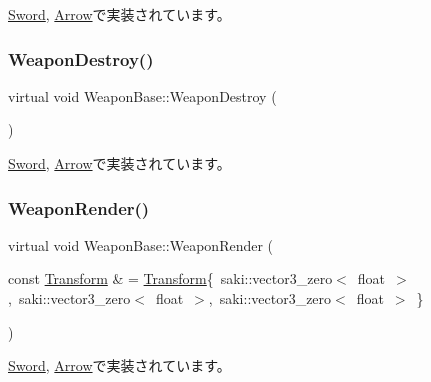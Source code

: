 \mbox{\hyperlink{class_sword_a6c8642e6a8f1d6152abce6c84bf6d21b}{Sword}}, \mbox{\hyperlink{class_arrow_a98ea469bf0b21635b2d2dadb69c72240}{Arrow}}で実装されています。

\mbox{\label{class_weapon_base_a417784a8c8bf73cd398a77b922fc110c}} 
\subsubsection{\texorpdfstring{Weapon\+Destroy()}{WeaponDestroy()}}
{\footnotesize\ttfamily virtual void Weapon\+Base\+::\+Weapon\+Destroy (\begin{DoxyParamCaption}{ }\end{DoxyParamCaption})\hspace{0.3cm}{\ttfamily [pure virtual]}}



\mbox{\hyperlink{class_sword_a3f60d8b24b7847d6a84f0941820b711d}{Sword}}, \mbox{\hyperlink{class_arrow_a1101d1159771b5c428afd3c7a6a0a4df}{Arrow}}で実装されています。

\mbox{\label{class_weapon_base_af308d16d3892c3ffaeedf74b08e761b9}} 
\subsubsection{\texorpdfstring{Weapon\+Render()}{WeaponRender()}}
{\footnotesize\ttfamily virtual void Weapon\+Base\+::\+Weapon\+Render (\begin{DoxyParamCaption}\item[{const \mbox{\hyperlink{common_8h_a1c43cb8f0d8a41901f3ce4c67dbbce20}{Transform}} \&}]{ = {\ttfamily \mbox{\hyperlink{common_8h_a1c43cb8f0d8a41901f3ce4c67dbbce20}{Transform}}\{~saki\+:\+:vector3\+\_\+zero$<$~float~$>$,~saki\+:\+:vector3\+\_\+zero$<$~float~$>$,~saki\+:\+:vector3\+\_\+zero$<$~float~$>$~\}} }\end{DoxyParamCaption})\hspace{0.3cm}{\ttfamily [pure virtual]}}



\mbox{\hyperlink{class_sword_ac80e3b54ef5572eae1e4760d14383f4f}{Sword}}, \mbox{\hyperlink{class_arrow_af9e54760156a77a15ad98a88f712ebdb}{Arrow}}で実装されています。

